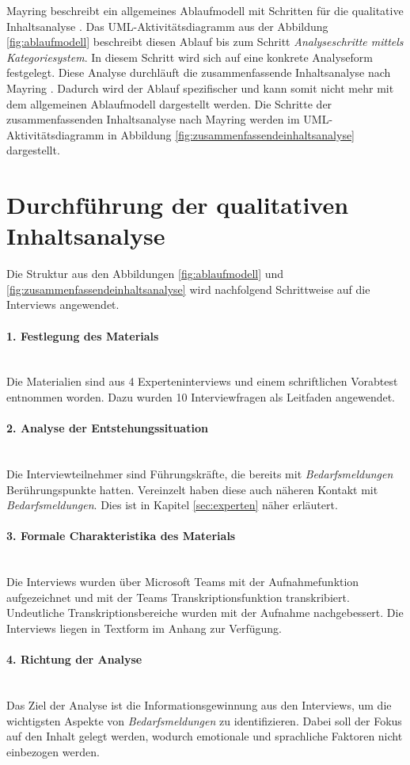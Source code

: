Mayring beschreibt ein allgemeines Ablaufmodell mit Schritten für die qualitative Inhaltsanalyse \cite{mayring2019qualitative}. Das UML-Aktivitätsdiagramm aus der Abbildung \ref{fig:ablaufmodell} beschreibt diesen Ablauf bis zum Schritt \emph{Analyseschritte mittels Kategoriesystem}. In diesem Schritt wird sich auf eine konkrete Analyseform festgelegt. Diese Analyse durchläuft die zusammenfassende Inhaltsanalyse nach Mayring \cite{mayring2019qualitative}. Dadurch wird der Ablauf spezifischer und kann somit nicht mehr mit dem allgemeinen Ablaufmodell dargestellt werden. Die Schritte der zusammenfassenden Inhaltsanalyse nach Mayring werden im UML-Aktivitätsdiagramm in Abbildung \ref{fig:zusammenfassendeinhaltsanalyse} dargestellt.
\section{Durchführung der qualitativen Inhaltsanalyse}
Die Struktur aus den Abbildungen \ref{fig:ablaufmodell} und \ref{fig:zusammenfassendeinhaltsanalyse} wird nachfolgend Schrittweise auf die Interviews angewendet.
\paragraph{1. Festlegung des Materials}\mbox{} \\
Die Materialien sind aus 4 Experteninterviews und einem schriftlichen Vorabtest entnommen worden. Dazu wurden 10 Interviewfragen als Leitfaden angewendet.
\paragraph{2. Analyse der Entstehungssituation}\mbox{} \\
Die Interviewteilnehmer sind Führungskräfte, die bereits mit \emph{Bedarfsmeldungen} Berührungspunkte hatten. Vereinzelt haben diese auch näheren Kontakt mit \emph{Bedarfsmeldungen}. Dies ist in Kapitel \ref{sec:experten} näher erläutert.
\paragraph{3. Formale Charakteristika des Materials}\mbox{} \\
Die Interviews wurden über Microsoft Teams mit der Aufnahmefunktion aufgezeichnet und mit der Teams Transkriptionsfunktion transkribiert. Undeutliche Transkriptionsbereiche wurden mit der Aufnahme nachgebessert. Die Interviews liegen in Textform im Anhang zur Verfügung.
\paragraph{4. Richtung der Analyse}\mbox{} \\
Das Ziel der Analyse ist die Informationsgewinnung aus den Interviews, um die wichtigsten Aspekte von \emph{Bedarfsmeldungen} zu identifizieren. Dabei soll der Fokus auf den Inhalt gelegt werden, wodurch emotionale und sprachliche Faktoren nicht einbezogen werden.
